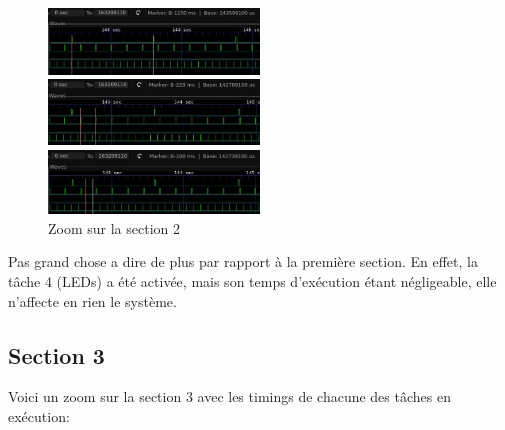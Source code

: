 \documentclass[11pt, a4paper]{article}
\begin{document}
\begin{figure}[H]
    \begin{multicols}{2}
        \begin{center}
            \includegraphics[width=0.5\textwidth]{section2_leds_t1_light}
        \end{center}
        \columnbreak
        \begin{center}
            \includegraphics[width=0.5\textwidth]{section2_leds_t2_cmd}
        \end{center}
    \end{multicols}
    \begin{center}
        \includegraphics[width=0.5\textwidth]{section2_leds_t4_leds}
    \end{center}
    \caption{Zoom sur la section 2}
    \label{Zoom sur la section 2}
\end{figure}

Pas grand chose a dire de plus par rapport à la première section.
En effet, la tâche 4 (LEDs) a été activée, mais son temps d'exécution étant négligeable,
elle n'affecte en rien le système.

\subsection{Section 3}

Voici un zoom sur la section 3 avec les timings de chacune des tâches en exécution:
\end{document}

